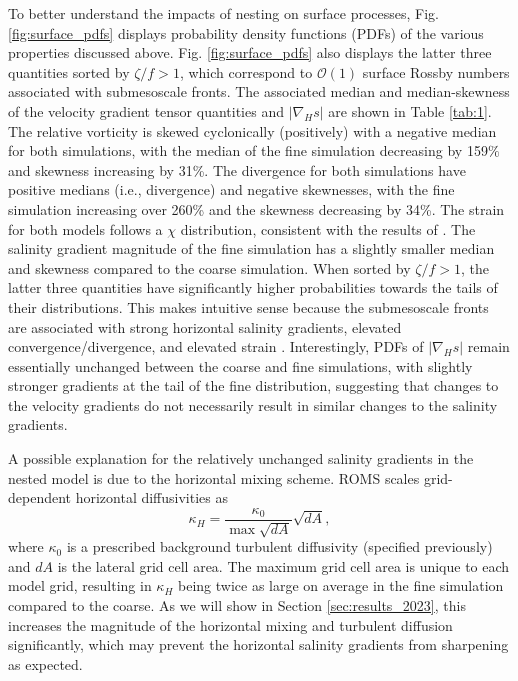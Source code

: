 To better understand the impacts of nesting on surface processes, Fig. \ref{fig:surface_pdfs} displays probability density functions (PDFs) of the various properties discussed above. Fig. \ref{fig:surface_pdfs} also displays the latter three quantities sorted by $\zeta/f>1$, which correspond to $\mathcal{O}(1)$ surface Rossby numbers associated with submesoscale fronts. The associated median and median-skewness of the velocity gradient tensor quantities and $|\nabla_H s|$ are shown in Table \ref{tab:1}. The relative vorticity is skewed cyclonically (positively) with a negative median for both simulations, with the median of the fine simulation decreasing by 159$\%$ and skewness increasing by 31\%. The divergence for both simulations have positive medians (i.e., divergence) and negative skewnesses, with the fine simulation increasing over 260\% and the skewness decreasing by 34\%. The strain for both models follows a $\chi$ distribution, consistent with the results of \citet{Shcherbina_2013}. The salinity gradient magnitude of the fine simulation has a slightly smaller median and skewness compared to the coarse simulation. When sorted by $\zeta/f>1$, the latter three quantities have significantly higher probabilities towards the tails of their distributions. This makes intuitive sense because the submesoscale fronts are associated with strong horizontal salinity gradients, elevated convergence/divergence, and elevated strain \citep{McWilliams_2016}. Interestingly, PDFs of $|\nabla_H s|$ remain essentially unchanged between the coarse and fine simulations, with slightly stronger gradients at the tail of the fine distribution, suggesting that changes to the velocity gradients do not necessarily result in similar changes to the salinity gradients. 

A possible explanation for the relatively unchanged salinity gradients in the nested model is due to the horizontal mixing scheme. ROMS scales grid-dependent horizontal diffusivities as
\begin{equation} \label{eq:kappa_H}
    \kappa_H = \frac{\kappa_{0}}{\max \sqrt{dA}}\sqrt{dA},
\end{equation}
where $\kappa_0$ is a prescribed background turbulent diffusivity (specified previously) and $dA$ is the lateral grid cell area. The maximum grid cell area is unique to each model grid, resulting in $\kappa_H$ being twice as large on average in the fine simulation compared to the coarse. As we will show in Section \ref{sec:results_2023}, this increases the magnitude of the horizontal mixing and turbulent diffusion significantly, which may prevent the horizontal salinity gradients from sharpening as expected. 


